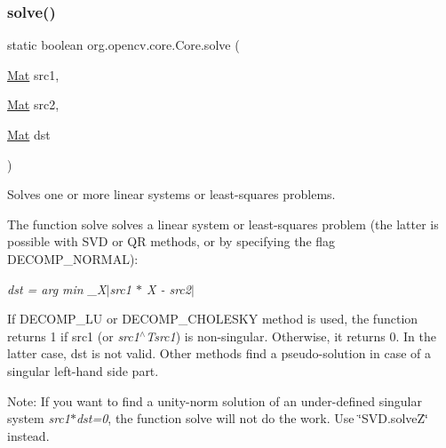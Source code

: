 \subsubsection{\texorpdfstring{solve()}{solve()}\hspace{0.1cm}{\footnotesize\ttfamily [2/2]}}
{\footnotesize\ttfamily static boolean org.\+opencv.\+core.\+Core.\+solve (\begin{DoxyParamCaption}\item[{\mbox{\hyperlink{classorg_1_1opencv_1_1core_1_1_mat}{Mat}}}]{src1,  }\item[{\mbox{\hyperlink{classorg_1_1opencv_1_1core_1_1_mat}{Mat}}}]{src2,  }\item[{\mbox{\hyperlink{classorg_1_1opencv_1_1core_1_1_mat}{Mat}}}]{dst }\end{DoxyParamCaption})\hspace{0.3cm}{\ttfamily [static]}}

Solves one or more linear systems or least-\/squares problems.

The function {\ttfamily solve} solves a linear system or least-\/squares problem (the latter is possible with S\+VD or QR methods, or by specifying the flag {\ttfamily D\+E\+C\+O\+M\+P\+\_\+\+N\+O\+R\+M\+AL})\+:

{\itshape dst = arg min \+\_\+\+X$\vert$src1 $\ast$ X -\/ src2$\vert$}

If {\ttfamily D\+E\+C\+O\+M\+P\+\_\+\+LU} or {\ttfamily D\+E\+C\+O\+M\+P\+\_\+\+C\+H\+O\+L\+E\+S\+KY} method is used, the function returns 1 if {\ttfamily src1} (or {\itshape src1$^\wedge$\+Tsrc1}) is non-\/singular. Otherwise, it returns 0. In the latter case, {\ttfamily dst} is not valid. Other methods find a pseudo-\/solution in case of a singular left-\/hand side part.

Note\+: If you want to find a unity-\/norm solution of an under-\/defined singular system {\itshape src1$\ast$dst=0}, the function {\ttfamily solve} will not do the work. Use \char`\"{}\+S\+V\+D.\+solve\+Z\char`\"{} instead.


